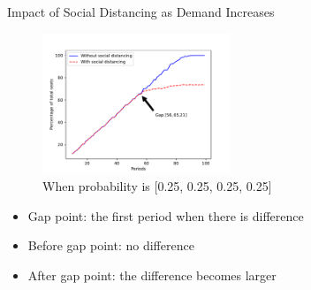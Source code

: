     \begin{frame}{Impact of Social Distancing as Demand Increases}
      \vspace{-0.4cm}
      \begin{figure}[h]
        \centering
        \includegraphics[width=0.5\textwidth]{./images/p1.pdf}          
        \caption{When probability is [0.25, 0.25, 0.25, 0.25]}
        \end{figure}
        
      \vspace{-0.2cm}
      \begin{itemize}
        \item Gap point: the first period when there is difference 
        \item Before gap point: no difference
        \item After gap point: the difference becomes larger
      \end{itemize}
  \end{frame}

